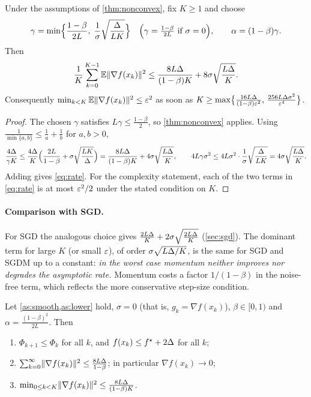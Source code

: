 \begin{corollary}\label{cor:rate}
Under the assumptions of \cref{thm:nonconvex}, fix $K\ge1$ and choose
\[
  \gamma=\min\Bigl\{\frac{1-\beta}{2L},\;\frac1\sigma\sqrt{\frac{\Delta}{LK}}\Bigr\}
  \quad\Bigl(\gamma=\tfrac{1-\beta}{2L}\text{ if }\sigma=0\Bigr),
  \qquad\alpha=(1-\beta)\gamma .
\]
Then
\begin{equation}\label{eq:rate}
  \frac1K\sum_{k=0}^{K-1}\mathbb{E}\lVert \nabla f(x_k)\rVert^2\le\frac{8L\Delta}{(1-\beta)K}+8\sigma\sqrt{\frac{L\Delta}{K}} .
\end{equation}
Consequently $\min_{k<K}\mathbb{E}\lVert \nabla f(x_k)\rVert^2\le\varepsilon^2$ as soon as
$K\ge\max\bigl\{\frac{16L\Delta}{(1-\beta)\varepsilon^2},\,\frac{256L\Delta\sigma^2}{\varepsilon^4}\bigr\}$.
\end{corollary}

\begin{proof}
The chosen $\gamma$ satisfies $L\gamma\le\frac{1-\beta}2$, so \cref{thm:nonconvex}
applies. Using $\frac{1}{\min\{a,b\}}\le\frac1a+\frac1b$ for $a,b>0$,
\[
  \frac{4\Delta}{\gamma K}\le\frac{4\Delta}{K}\Bigl(\frac{2L}{1-\beta}+\sigma\sqrt{\frac{LK}{\Delta}}\Bigr)
  =\frac{8L\Delta}{(1-\beta)K}+4\sigma\sqrt{\frac{L\Delta}{K}},
  \qquad
  4L\gamma\sigma^2\le4L\sigma^2\cdot\frac1\sigma\sqrt{\frac{\Delta}{LK}}=4\sigma\sqrt{\frac{L\Delta}{K}} .
\]
Adding gives \eqref{eq:rate}. For the complexity statement, each of the two terms in
\eqref{eq:rate} is at most $\varepsilon^2/2$ under the stated condition on $K$.
\end{proof}

\paragraph{Comparison with SGD.} For SGD the analogous choice gives
$\frac{2L\Delta}{K}+2\sigma\sqrt{\frac{2L\Delta}{K}}$ (\cref{sec:sgd}). The dominant term for
large $K$ (or small $\varepsilon$), of order $\sigma\sqrt{L\Delta/K}$, is the same for SGD and SGDM
up to a constant: \emph{in the worst case momentum neither improves nor degrades the
asymptotic rate.} Momentum costs a factor $1/(1-\beta)$ in the noise-free term, which
reflects the more conservative step-size condition.

\begin{corollary}\label{cor:deterministic}
Let \cref{as:smooth,as:lower} hold, $\sigma=0$ (that is, $g_k=\nabla f(x_k)$), $\beta\in[0,1)$
and $\alpha=\frac{(1-\beta)^2}{2L}$. Then
\begin{enumerate}[label=\textup{(\roman*)}]
\item $\Phi_{k+1}\le\Phi_k$ for all $k$, and $f(x_k)\le f^\star+2\Delta$ for all $k$;
\item $\sum_{k=0}^\infty\lVert \nabla f(x_k)\rVert^2\le\frac{8L\Delta}{1-\beta}$; in particular $\nabla f(x_k)\to0$;
\item $\min_{0\le k<K}\lVert \nabla f(x_k)\rVert^2\le\frac{8L\Delta}{(1-\beta)K}$.
\end{enumerate}
\end{corollary}

